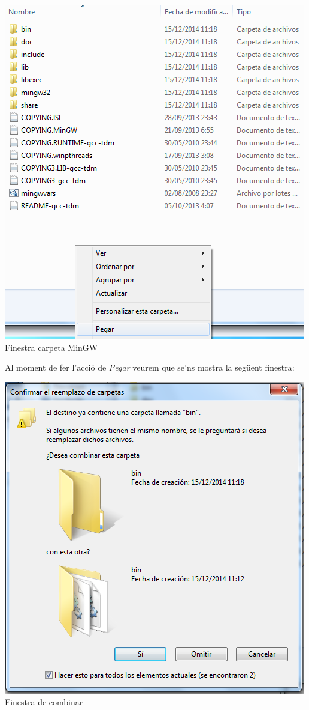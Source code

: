 \documentclass[11pt]{article}
\begin{document}
\begin{center}
\includegraphics[scale=0.4]{img/Paste.png}\\
\small{Finestra carpeta MinGW}\\
\end{center}


\newpage

\noindent Al moment de fer l'acció de \textit{Pegar} veurem que se'ns mostra la següent finestra:

\begin{center}

\includegraphics[scale=0.5]{img/Merge.png}\\
\small{Finestra de combinar}\\
\end{center}
\end{document}
